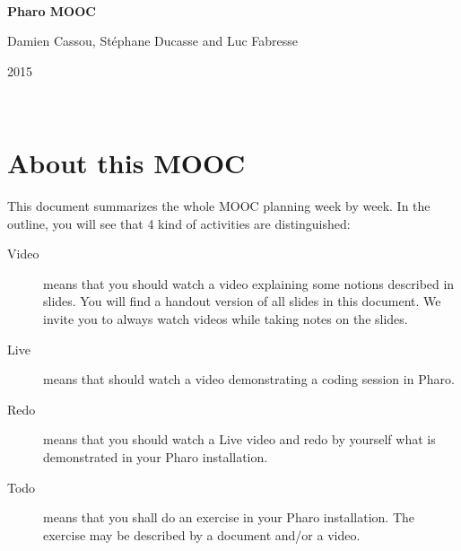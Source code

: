 \documentclass[a4paper,11pt,final]{book}
\newenvironment{shadowblock}[1]%
{\begin{tcolorbox}[width=#1]}
{\end{tcolorbox}}
\begin{document}

\thispagestyle{empty}
\begin{center}
	\vspace*{1em}

	~\vfill %
	
	\begin{shadowblock}{\linewidth}
		\centering
		\begin{minipage}{\linewidth}
		\noindent\vspace*{1em}
		\begin{center}
		\textbf{\Huge Pharo MOOC}
		
		\vspace*{3.5em}
	
		{\LARGE Damien Cassou, Stéphane Ducasse and Luc Fabresse}
      
      \vspace*{2em}
      
      2015\\  
      \vspace*{0.5em}
	\end{center}    
	 
      \vspace*{1em}
	\end{minipage}
	\end{shadowblock}
\end{center}

~\vfill %

\newpage

\chapter*{About this MOOC}

This document summarizes the whole MOOC planning week by week.
In the outline, you will see that 4 kind of activities are distinguished:

\begin{description}
\item[Video] means that you should watch a video explaining some notions described in slides.
You will find a handout version of all slides in this document. 
We invite you to always watch videos while taking notes on the slides.

\item[Live] means that should watch a video demonstrating a coding session in Pharo. 

\item[Redo] means that you should watch a Live video and redo by yourself what is demonstrated in your Pharo installation.

\item[Todo] means that you shall do an exercise in your Pharo installation. The exercise may be described by a document and/or a video.

\end{description}
\end{document}

